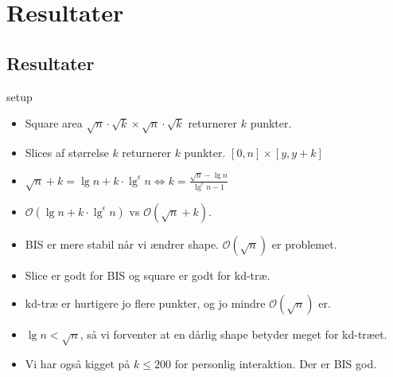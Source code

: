 \documentclass[pdf]{beamer}
\begin{document}
\section{Resultater}
\subsection{Resultater}

\begin{frame}{setup}
  \begin{itemize}
    \item Square area $\sqrt{n}\cdot\sqrt{k}\times\sqrt{n}\cdot\sqrt{k}$ returnerer $k$ punkter.
    \item Slices af størrelse $k$ returnerer $k$ punkter. $[0,n] \times [y, y+k]$
    \item $\sqrt{n}+k = \lg n + k\cdot\lg^\epsilon n \Leftrightarrow k = \frac{\sqrt{n}-\lg n}{\lg^\epsilon n -1}$
  \end{itemize}
\end{frame}

\begin{frame}
      \begin{itemize}
        \item $\mathcal{O}(\lg n + k\cdot\lg^\epsilon n)$ vs $\mathcal{O}(\sqrt{n} + k)$.
        \item BIS er mere stabil når vi ændrer shape. $\mathcal{O}(\sqrt{n})$ er problemet.
        \item Slice er godt for BIS og square er godt for kd-træ.
        \item kd-træ er hurtigere jo flere punkter, og jo mindre $\mathcal{O}(\sqrt{n})$ er.
        \item $\lg n < \sqrt{n}$, så vi forventer at en dårlig shape betyder meget for kd-træet.
        \item Vi har også kigget på $k \leq 200$ for personlig interaktion. Der er BIS god.
      \end{itemize}
\end{frame}
\end{document}

